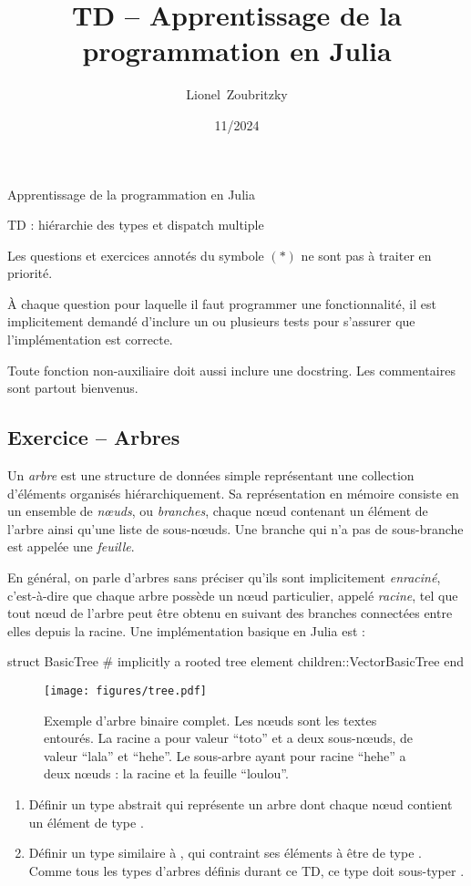 \documentclass{article}
\title{TD -- Apprentissage de la programmation en Julia}
\author{Lionel~Zoubritzky}
\date{11/2024}
\newcounter{loop}
\newcounter{numEx}
\newcommand{\exo}[1]{
	\stepcounter{numEx}
	\setcounter{loop}{0}
	\subsection*{Exercice \arabic{numEx} -- #1}
}
\newenvironment{repl}{\vspace{-0.6em}\VerbatimEnvironment\begin{jlrepl}}{\end{jlrepl}}
\begin{document}
	
\begin{center}
	\Large Apprentissage de la programmation en Julia
	
	TD  : hiérarchie des types et dispatch multiple
	\vspace{2em}
\end{center}

Les questions et exercices annotés du symbole $(*)$ ne sont pas à traiter en priorité.

À chaque question pour laquelle il faut programmer une fonctionnalité, il est implicitement demandé d'inclure un ou plusieurs tests pour s'assurer que l'implémentation est correcte.

Toute fonction non-auxiliaire doit aussi inclure une docstring. Les commentaires sont partout bienvenus.

\exo{Arbres}

Un \emph{arbre} est une structure de données simple représentant une collection d'éléments organisés hiérarchiquement. Sa représentation en mémoire consiste en un ensemble de \emph{nœuds}, ou \emph{branches}, chaque nœud contenant un élément de l'arbre ainsi qu'une liste de sous-nœuds. Une branche qui n'a pas de sous-branche est appelée une \emph{feuille}.

En général, on parle d'arbres sans préciser qu'ils sont implicitement \emph{enraciné}, c'est-à-dire que chaque arbre possède un nœud particulier, appelé \emph{racine}, tel que tout nœud de l'arbre peut être obtenu en suivant des branches connectées entre elles depuis la racine. Une implémentation basique en Julia est :
\begin{repl}
	struct BasicTree  # implicitly a rooted tree
		element
		children::Vector{BasicTree}
	end
\end{repl}

\begin{figure}[bh]
	\centering
	\texttt{[image: figures/tree.pdf]}
	\caption{Exemple d'arbre binaire complet. Les nœuds sont les textes entourés. La racine a pour valeur ``toto'' et a deux sous-nœuds, de valeur ``lala'' et ``hehe''. Le sous-arbre ayant pour racine ``hehe'' a deux nœuds : la racine et la feuille ``loulou''.}
\end{figure}

\begin{enumerate}
	\item Définir un type abstrait  qui représente un arbre dont chaque nœud contient un élément de type .
	
	\item Définir un type  similaire à , qui contraint ses éléments à être de type . Comme tous les types d'arbres définis durant ce TD, ce type doit sous-typer .
\end{enumerate}
\end{document}
